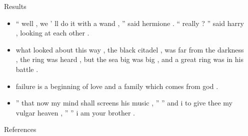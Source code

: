 \documentclass[final]{beamer}
\newcommand{\compresslist}{
  \setlength{\itemsep}{1pt}
  \setlength{\parskip}{0pt}
  \setlength{\parsep}{0pt}}
\newlength{\sepwidth}
\newlength{\colwidth}
\newcommand{\separatorcolumn}{\begin{column}{\sepwidth}\end{column}}
\begin{document}
\begin{frame}[t]
\begin{columns}[t]
\begin{column}{\colwidth}
\begin{block}{Results}
\begin{itemize}\compresslist
    \item `` well , we ' ll do it with a wand , '' said hermione . `` really ?
      '' said harry , looking at each other .
    \item  what looked about this
      way , the black citadel , was far from the
          darkness , the ring was heard , but the sea big was big , and a great
          ring was in his battle .
    \item failure is a beginning of love and a family which comes from god .
    \item  '' that now my mind shall screens his music , '' '' and i to give
      thee my vulgar heaven , '' '' i am your brother .
\end{itemize}
\end{block}
\begin{block}{References}
\printbibliography
\end{block}

\end{column}

\separatorcolumn
\end{columns}
\end{frame}
\end{document}
